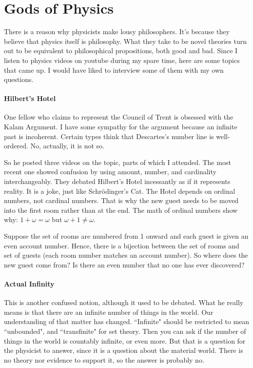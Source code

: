 \section{Gods of Physics}

There is a reason why physicists make lousy philosophers. It's because they believe that physics itself is philosophy. What they take to be novel theories turn out to be equivalent to philosophical propositions, both good and bad. Since I listen to physics videos on youtube during my spare time, here are some topics that came up. I would have liked to interview some of them with my own questions.

\paragraph{Hilbert's Hotel}
One fellow who claims to represent the Council of Trent is obsessed with the Kalam Argument. I have some sympathy for the argument because an infinite past is incoherent. Certain types think that Descartes's number line is well-ordered. No, actually, it is not so.

So he posted three videos on the topic, parts of which I attended. The most recent one showed confusion by using amount, number, and cardinality interchangeably. They debated Hilbert's Hotel incessantly as if it represents reality. It is a joke, just like Schrödinger's Cat. The Hotel depends on ordinal numbers, not cardinal numbers. That is why the new guest needs to be moved into the first room rather than at the end. The math of ordinal numbers show why: $1 + \omega = \omega$ but $\omega + 1 \neq \omega$.

Suppose the set of rooms are numbered from 1 onward and each guest is given an even account number. Hence, there is a bijection between the set of rooms and set of guests (each room number matches an account number). So where does the new guest come from? Is there an even number that no one has ever discovered?

\paragraph{Actual Infinity}
This is another confused notion, although it used to be debated. What he really means is that there are an infinite number of things in the world. Our understanding of that matter has changed. ``Infinite" should be restricted to mean ``unbounded", and ``transfinite" for set theory. Then you can ask if the number of things in the world is countably infinite, or even more. But that is a question for the physicist to answer, since it is a question about the material world. There is no theory nor evidence to support it, so the answer is probably no.

